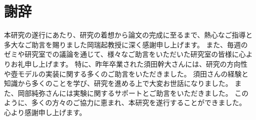 \documentclass[uplatex,11pt,openany]{ujreport}
\begin{document}
\chapter*{謝辞}
本研究の遂行にあたり、研究の着想から論文の完成に至るまで、熱心なご指導と多大なご助言を賜りました岡瑞起教授に深く感謝申し上げます。
また、毎週のゼミや研究室での議論を通じて、様々なご助言をいただいた研究室の皆様に心よりお礼申し上げます。
特に、昨年卒業された須田幹大さんには、研究の方向性や壺モデルの実装に関する多くのご助言をいただきました。
須田さんの経験と知識から多くのことを学び、研究を進める上で大変お世話になりました。
また、岡部純弥さんには実験に関するサポートとご助言をいただきました。
このように、多くの方々のご協力に恵まれ、本研究を遂行することができました。
心より感謝申し上げます。


\newpage


% 
% 
\end{document}
